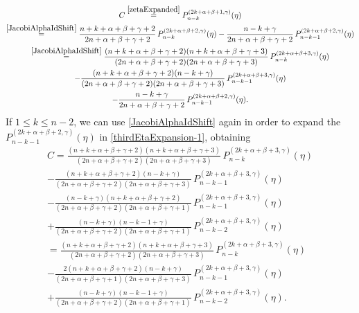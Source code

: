 \documentclass{article}
\numberwithin{equation}{section}
\numberwithin{figure}{section}
\begin{document}
\begin{multline}\label{thirdEtaExpansion-1}
C \stackrel{\eqref{zetaExpanded}}{=} P^{(2k+\alpha+\beta+1,\gamma)}_{n-k}(\eta)\\
\stackrel{\eqref{JacobiAlphaIdShift}}{=} \frac{n+k+\alpha+\beta+\gamma+2}{2n+\alpha+\beta+\gamma+2} \, P^{(2k+\alpha+\beta+2,\gamma)}_{n-k}(\eta) - \frac{n-k+\gamma}{2n+\alpha+\beta+\gamma+2} \, P^{(2k+\alpha+\beta+2,\gamma)}_{n-k-1}(\eta)\\
\stackrel{\eqref{JacobiAlphaIdShift}}{=} \frac{(n+k+\alpha+\beta+\gamma+2)(n+k+\alpha+\beta+\gamma+3)}{(2n+\alpha+\beta+\gamma+2)(2n+\alpha+\beta+\gamma+3)} \, P^{(2k+\alpha+\beta+3,\gamma)}_{n-k}(\eta)\\
- \frac{(n+k+\alpha+\beta+\gamma+2)(n-k+\gamma)}{(2n+\alpha+\beta+\gamma+2)(2n+\alpha+\beta+\gamma+3)} \, P^{(2k+\alpha+\beta+3,\gamma)}_{n-k-1}(\eta)\\
- \frac{n-k+\gamma}{2n+\alpha+\beta+\gamma+2} \, P^{(2k+\alpha+\beta+2,\gamma)}_{n-k-1}(\eta).
\end{multline}
%
If $1 \leq k \leq n-2$, we can use \eqref{JacobiAlphaIdShift} again in order to expand the $P^{(2k+\alpha+\beta+2,\gamma)}_{n-k-1}(\eta)$ in \eqref{thirdEtaExpansion-1}, obtaining
%
\begin{multline}\label{thirdEtaExpansion-2a}
C
= \frac{(n+k+\alpha+\beta+\gamma+2)(n+k+\alpha+\beta+\gamma+3)}{(2n+\alpha+\beta+\gamma+2)(2n+\alpha+\beta+\gamma+3)} \, P^{(2k+\alpha+\beta+3,\gamma)}_{n-k}(\eta)\\
- \frac{(n+k+\alpha+\beta+\gamma+2)(n-k+\gamma)}{(2n+\alpha+\beta+\gamma+2)(2n+\alpha+\beta+\gamma+3)} \, P^{(2k+\alpha+\beta+3,\gamma)}_{n-k-1}(\eta)\\
- \frac{(n-k+\gamma)(n+k+\alpha+\beta+\gamma+2)}{(2n+\alpha+\beta+\gamma+2)(2n+\alpha+\beta+\gamma+1)} \, P^{(2k+\alpha+\beta+3,\gamma)}_{n-k-1}(\eta)\\
+ \frac{(n-k+\gamma)(n-k-1+\gamma)}{(2n+\alpha+\beta+\gamma+2)(2n+\alpha+\beta+\gamma+1)} \, P^{(2k+\alpha+\beta+3,\gamma)}_{n-k-2}(\eta)\\
= \frac{(n+k+\alpha+\beta+\gamma+2)(n+k+\alpha+\beta+\gamma+3)}{(2n+\alpha+\beta+\gamma+2)(2n+\alpha+\beta+\gamma+3)} \, P^{(2k+\alpha+\beta+3,\gamma)}_{n-k}(\eta)\\
- \frac{2(n+k+\alpha+\beta+\gamma+2)(n-k+\gamma)}{(2n+\alpha+\beta+\gamma+1)(2n+\alpha+\beta+\gamma+3)} \, P^{(2k+\alpha+\beta+3,\gamma)}_{n-k-1}(\eta)\\
+ \frac{(n-k+\gamma)(n-k-1+\gamma)}{(2n+\alpha+\beta+\gamma+2)(2n+\alpha+\beta+\gamma+1)} \, P^{(2k+\alpha+\beta+3,\gamma)}_{n-k-2}(\eta).
\end{multline}
\end{document}
